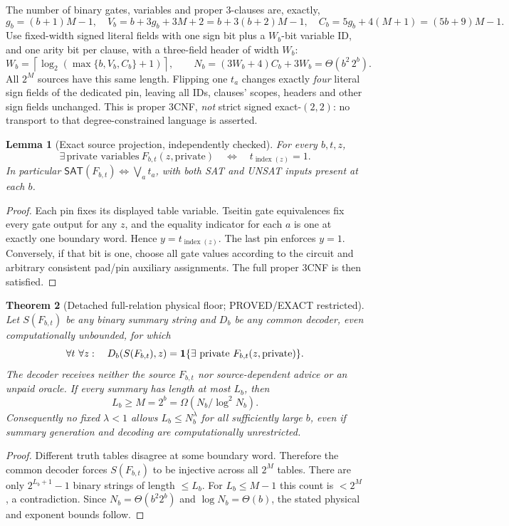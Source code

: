 \documentclass[11pt]{article}
\newtheorem{theorem}{Theorem}
\newtheorem{lemma}[theorem]{Lemma}
\newcommand{\SAT}{\mathsf{SAT}}
\begin{document}
The number of binary gates, variables and proper 3-clauses are, exactly,
\[
 g_b=(b+1)M-1,\quad
 V_b=b+3g_b+3M+2=b+3(b+2)M-1,\quad
 C_b=5g_b+4(M+1)=(5b+9)M-1.
\]
Use fixed-width signed literal fields with one sign bit plus a $W_b$-bit variable ID, and one arity bit per clause, with a three-field header of width $W_b$:
\[
 W_b=\left\lceil\log_2(\max\{b,V_b,C_b\}+1)\right\rceil,\qquad
 N_b=(3W_b+4)C_b+3W_b=\Theta(b^2\,2^b).
\]
All $2^M$ sources have this same length. Flipping one $t_a$ changes exactly \emph{four} literal sign fields of the dedicated pin, leaving all IDs, clauses' scopes, headers and other sign fields unchanged. This is proper 3CNF, \emph{not} strict signed exact-$(2,2)$: no transport to that degree-constrained language is asserted.

\begin{lemma}[Exact source projection, independently checked]
For every $b,t,z$,
\[
 \exists\,\text{private variables}\ F_{b,t}(z,\text{private})
 \quad\Longleftrightarrow\quad t_{\operatorname{index}(z)}=1.
\]
In particular $\SAT(F_{b,t})\iff\bigvee_a t_a$, with both SAT and UNSAT inputs present at each $b$.
\end{lemma}
\begin{proof}Each pin fixes its displayed table variable. Tseitin gate equivalences fix every gate output for any $z$, and the equality indicator for each $a$ is one at exactly one boundary word. Hence $y=t_{\operatorname{index}(z)}$. The last pin enforces $y=1$. Conversely, if that bit is one, choose all gate values according to the circuit and arbitrary consistent pad/pin auxiliary assignments. The full proper 3CNF is then satisfied.\end{proof}

\begin{theorem}[Detached full-relation physical floor; PROVED/EXACT restricted]
Let $S(F_{b,t})$ be any binary summary string and $D_b$ be any \emph{common} decoder, even computationally unbounded, for which
\[
 \forall t\ \forall z:\quad
 D_b(S(F_{b,t}),z)=
 {\bf1}\{\exists\text{ private }F_{b,t}(z,\text{private})\}.
\]
The decoder receives neither the source $F_{b,t}$ nor source-dependent advice or an unpaid oracle. If every summary has length at most $L_b$, then
\[
  L_b\ge M=2^b=\Omega(N_b/\log^2 N_b).
\]
Consequently no fixed $\lambda<1$ allows $L_b\le N_b^\lambda$ for all sufficiently large $b$, even if summary generation and decoding are computationally unrestricted.
\end{theorem}
\begin{proof}
Different truth tables disagree at some boundary word. Therefore the common decoder forces $S(F_{b,t})$ to be injective across all $2^M$ tables. There are only $2^{L_b+1}-1$ binary strings of length $\le L_b$. For $L_b\le M-1$ this count is $<2^M$, a contradiction. Since $N_b=\Theta(b^2 2^b)$ and $\log N_b=\Theta(b)$, the stated physical and exponent bounds follow.\end{proof}
\end{document}
